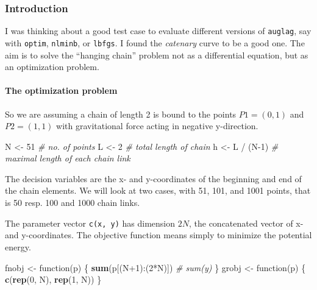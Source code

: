 \documentclass[]{article}
\newenvironment{Shaded}{\begin{snugshade}}{\end{snugshade}}
\newcommand{\KeywordTok}[1]{\textcolor[rgb]{0.13,0.29,0.53}{\textbf{{#1}}}}
\newcommand{\DecValTok}[1]{\textcolor[rgb]{0.00,0.00,0.81}{{#1}}}
\newcommand{\StringTok}[1]{\textcolor[rgb]{0.31,0.60,0.02}{{#1}}}
\newcommand{\CommentTok}[1]{\textcolor[rgb]{0.56,0.35,0.01}{\textit{{#1}}}}
\newcommand{\NormalTok}[1]{{#1}}
\let\oldparagraph\paragraph
\renewcommand{\paragraph}[1]{\oldparagraph{#1}\mbox{}}
\begin{document}
\subsubsection{Introduction}\label{introduction}

I was thinking about a good test case to evaluate different versions of
\texttt{auglag}, say with \texttt{optim}, \texttt{nlminb}, or
\texttt{lbfgs}. I found the \emph{catenary} curve to be a good one. The
aim is to solve the ``hanging chain'' problem not as a differential
equation, but as an optimization problem.

\paragraph{The optimization problem}\label{the-optimization-problem}

So we are assuming a chain of length 2 is bound to the points
\(P1 = (0,1)\) and \(P2 = (1,1)\) with gravitational force acting in
negative y-direction.

\begin{Shaded}
\begin{Highlighting}[]
\NormalTok{N <-}\StringTok{ }\DecValTok{51}         \CommentTok{# no. of points}
\NormalTok{L <-}\StringTok{ }\DecValTok{2}          \CommentTok{# total length of chain}
\NormalTok{h <-}\StringTok{ }\NormalTok{L /}\StringTok{ }\NormalTok{(N}\DecValTok{-1}\NormalTok{)  }\CommentTok{# maximal length of each chain link}
\end{Highlighting}
\end{Shaded}

The decision variables are the x- and y-coordinates of the beginning and
end of the chain elements. We will look at two cases, with 51, 101, and
1001 points, that is 50 resp. 100 and 1000 chain links.

The parameter vector \texttt{c(x,\ y)} has dimension \(2 N\), the
concatenated vector of x- and y-coordinates. The objective function
means simply to minimize the potential energy.

\begin{Shaded}
\begin{Highlighting}[]
\NormalTok{fnobj <-}\StringTok{ }\NormalTok{function(p) \{}
    \KeywordTok{sum}\NormalTok{(p[(N}\DecValTok{+1}\NormalTok{):(}\DecValTok{2}\NormalTok{*N)])  }\CommentTok{# sum(y)}
\NormalTok{\}}
\NormalTok{grobj <-}\StringTok{ }\NormalTok{function(p) \{}
    \KeywordTok{c}\NormalTok{(}\KeywordTok{rep}\NormalTok{(}\DecValTok{0}\NormalTok{, N), }\KeywordTok{rep}\NormalTok{(}\DecValTok{1}\NormalTok{, N))}
\NormalTok{\}}
\end{Highlighting}
\end{Shaded}
\end{document}
